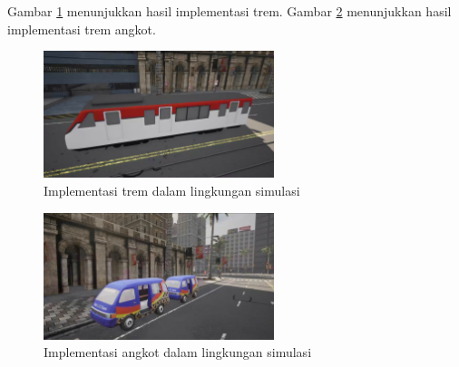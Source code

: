 




Gambar \ref{fig:tram-carla} menunjukkan hasil implementasi trem. Gambar
\ref{fig:angkot-carla} menunjukkan hasil implementasi trem  angkot.

\begin{figure}[ht]
    \centering
    \includegraphics[width=0.6\textwidth]{resources/chapter-4/tram-carla.png}
    \caption{Implementasi trem dalam lingkungan simulasi}
    \label{fig:tram-carla}
\end{figure}

\begin{figure}[ht]
    \centering
    \includegraphics[width=0.6\textwidth]{resources/chapter-4/angkot.png}
    \caption{Implementasi angkot dalam lingkungan simulasi}
    \label{fig:angkot-carla}
\end{figure}

